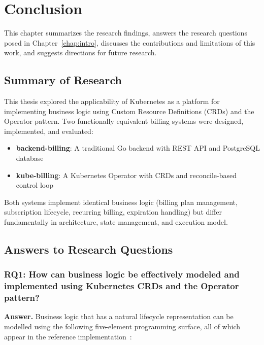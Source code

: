 \chapter{Conclusion}\label{chap:conclusion}

This chapter summarizes the research findings, answers the research questions posed in Chapter~\ref{chap:intro}, discusses the contributions and limitations of this work, and suggests directions for future research.

\section{Summary of Research}

This thesis explored the applicability of Kubernetes as a platform for implementing business logic using Custom Resource Definitions (CRDs) and the Operator pattern. Two functionally equivalent billing systems were designed, implemented, and evaluated:

\begin{itemize}
    \item \textbf{backend-billing}: A traditional Go backend with REST API and PostgreSQL database
    \item \textbf{kube-billing}: A Kubernetes Operator with CRDs and reconcile-based control loop
\end{itemize}

Both systems implement identical business logic (billing plan management, subscription lifecycle, recurring billing, expiration handling) but differ fundamentally in architecture, state management, and execution model.

\section{Answers to Research Questions}

\subsection{RQ1: How can business logic be effectively modeled and implemented using Kubernetes CRDs and the Operator pattern?}

\textbf{Answer.} Business logic that has a natural lifecycle representation can be modelled using the following five-element programming surface, all of which appear in the reference implementation~\cite{ibryam2020, dobies2020, hausenblas2019}:

